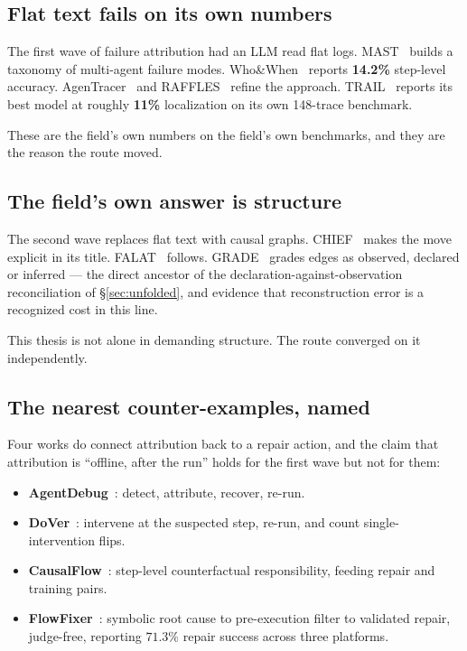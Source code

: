 \subsection*{Flat text fails on its own numbers}

The first wave of failure attribution had an LLM read flat logs.
MAST~\cite{mast} builds a taxonomy of multi-agent failure modes.
Who\&When~\cite{whowhen} reports \textbf{14.2\%} step-level accuracy.
AgenTracer~\cite{agentracer} and RAFFLES~\cite{raffles} refine the
approach. TRAIL~\cite{trail} reports its best model at roughly
\textbf{11\%} localization on its own 148-trace benchmark.

These are the field's own numbers on the field's own benchmarks, and they
are the reason the route moved.

\subsection*{The field's own answer is structure}

The second wave replaces flat text with causal graphs. CHIEF~\cite{chief}
makes the move explicit in its title. FALAT~\cite{falat} follows.
GRADE~\cite{grade} grades edges as observed, declared or inferred --- the
direct ancestor of the declaration-against-observation reconciliation of
\S\ref{sec:unfolded}, and evidence that reconstruction error is a
recognized cost in this line.

This thesis is not alone in demanding structure. The route converged on it
independently.

\subsection*{The nearest counter-examples, named}

Four works do connect attribution back to a repair action, and the claim
that attribution is ``offline, after the run'' holds for the first wave but
not for them:

\begin{itemize}
  \item \textbf{AgentDebug}~\cite{agentdebug}: detect, attribute, recover,
        re-run.
  \item \textbf{DoVer}~\cite{dover}: intervene at the suspected step,
        re-run, and count single-intervention flips.
  \item \textbf{CausalFlow}~\cite{causalflow}: step-level counterfactual
        responsibility, feeding repair and training pairs.
  \item \textbf{FlowFixer}~\cite{flowfixer}: symbolic root cause to
        pre-execution filter to validated repair, judge-free, reporting
        $71.3\%$ repair success across three platforms.
\end{itemize}

